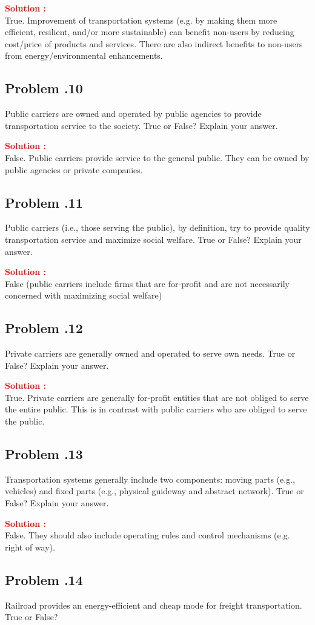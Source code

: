 \documentclass[12pt]{article}
\newcommand{\customsubsection}[1]{
  \subsection*{Problem \thesection.#1}
}
\begin{document}
\textbf{\textcolor{red}{Solution :}} \\
True. Improvement of transportation systems (e.g. by making them more efficient, resilient, and/or more sustainable) can benefit non-users by reducing cost/price of products and services. There are also indirect benefits to non-users from energy/environmental enhancements.
\newpage

\customsubsection{10}
Public carriers are owned and operated by public agencies to provide transportation service to the society. True or False? Explain your answer. 


\textbf{\textcolor{red}{Solution :}} \\
False. Public carriers provide service to the general public. They can be owned by public agencies or private companies.

\newpage

\customsubsection{11}
Public carriers (i.e., those serving the public), by definition, try to provide quality transportation service and maximize social welfare. True or False? Explain your answer. 


\textbf{\textcolor{red}{Solution :}} \\
False (public carriers include firms that are for-profit and are not necessarily concerned with maximizing social welfare)
\newpage


\customsubsection{12}
Private carriers are generally owned and operated to serve own needs.  True or False? Explain your answer. 


\textbf{\textcolor{red}{Solution :}} \\
True. Private carriers are generally for-profit entities that are not obliged to serve the entire public. This is in contrast with public carriers who are obliged to serve the public.
\newpage

\customsubsection{13}
Transportation systems generally include two components: moving parts (e.g., vehicles) and fixed parts (e.g., physical guideway and abstract network). True or False? Explain your answer. 


\textbf{\textcolor{red}{Solution :}} \\
False. They should also include operating rules and control mechanisms (e.g. right of way).

\newpage

\customsubsection{14}
Railroad provides an energy-efficient and cheap mode for freight transportation. True or False?
\end{document}
